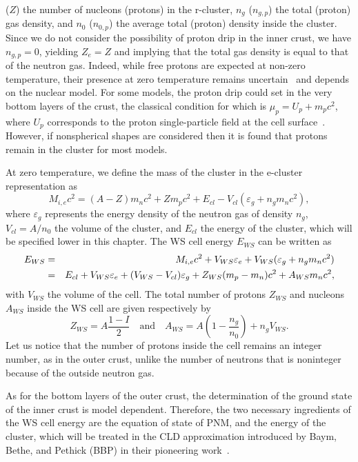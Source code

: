 ($Z$) the number of nucleons (protons) in the r-cluster, $n_g$ ($n_{g,p}$) the 
total (proton) gas density, and $n_0$ ($n_{0,p}$) the average total (proton) 
density inside the cluster. Since we do not consider the possibility of proton 
drip in the inner crust, we have $n_{g,p} = 0$, yielding $Z_e = Z$ and implying
that the total gas density is equal to that of the neutron gas. Indeed, 
while free protons are expected at non-zero temperature, their presence at zero 
temperature remains uncertain~\cite{BBP} and depends on the nuclear model. For 
some models, the proton drip could set in the very bottom layers of the crust, 
the classical condition for which is $\mu_p = U_p + m_pc^2$, where $U_p$ 
corresponds to the proton single-particle field at the cell 
surface~\cite{Pearson2018}. However, if nonspherical shapes are considered 
then it is found that protons remain in the cluster for most models.

{
  At zero temperature, we define the mass of the cluster in the e-cluster 
  representation as
  \begin{equation}
    M_{i,e} c^2 = (A - Z)m_n c^2 + Zm_p c^2 + E_{cl} 
    - V_{cl}(\varepsilon_g + n_g m_n c^2),\label{eq:mie}
  \end{equation}
  where $\varepsilon_g$ represents the energy density of the neutron gas of
  density $n_g$, $V_{cl}=A/n_0$ the volume of the cluster, and $E_{cl}$ the
  energy of the cluster, which will be specified lower in this chapter. 
  The WS cell energy $E_{WS}$ can be written as
  \begin{eqnarray}
    E_{WS} &=& M_{i,e} c^2 + V_{WS}\varepsilon_e + V_{WS}(\varepsilon_g + n_g
    m_n c^2) \notag\\
           &=& E_{cl} + V_{WS}\varepsilon_e + (V_{WS}-V_{cl})\varepsilon_g 
           + Z_{WS}(m_p - m_n)c^2 + A_{WS}m_nc^2,\label{eq:ews_icrust}
  \end{eqnarray}
  with $V_{WS}$ the volume of the cell. The total number of protons $Z_{WS}$ 
  and nucleons $A_{WS}$ inside the WS cell are given respectively by
  \begin{equation}
    Z_{WS} = A\frac{1-I}{2} \quad \text{and} \quad A_{WS} =
    A\left(1-\frac{n_g}{n_0}\right) + n_gV_{WS}.
\end{equation}
}
%
Let us notice that the number of protons inside the cell remains an
integer number, as in the outer crust, unlike the number of neutrons that is
noninteger because of the outside neutron gas.

As for the bottom layers of the outer crust, the determination of the ground 
state of the inner crust is model dependent.
Therefore, the two necessary ingredients of the WS cell energy are the 
equation of state of PNM, and the energy of the cluster, 
which will be treated in the CLD approximation 
introduced by Baym, Bethe, and Pethick (BBP) in their pioneering work~\cite{BBP}.

